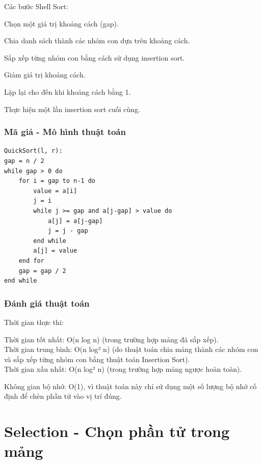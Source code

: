 \documentclass[12pt,a4paper]{report}
\begin{document}
Các bước Shell Sort:

Chọn một giá trị khoảng cách (gap).

Chia danh sách thành các nhóm con dựa trên khoảng cách.

Sắp xếp từng nhóm con bằng cách sử dụng insertion sort.

Giảm giá trị khoảng cách.

Lặp lại cho đến khi khoảng cách bằng 1.

Thực hiện một lần insertion sort cuối cùng.

\pagebreak

\subsection{ Mã giả - Mô hình thuật toán}

\begin{lstlisting}
QuickSort(l, r):
gap = n / 2
while gap > 0 do
    for i = gap to n-1 do
        value = a[i]
        j = i
        while j >= gap and a[j-gap] > value do
            a[j] = a[j-gap]
            j = j - gap
        end while
        a[j] = value
    end for
    gap = gap / 2
end while
\end{lstlisting}

\subsection{ Đánh giá thuật toán}

{Thời gian thực thi:

\hspace{0.5cm} Thời gian tốt nhất: O(n log n) (trong trường hợp mảng đã sắp xếp).\\

\hspace{0.5cm} Thời gian trung bình: O(n log² n) (do thuật toán chia mảng thành các nhóm con và sắp xếp từng nhóm con bằng thuật toán Insertion Sort).\\

\hspace{0.5cm} Thời gian xấu nhất: O(n log² n) (trong trường hợp mảng ngược hoàn toàn).\\}

{Không gian bộ nhớ: O(1), vì thuật toán này chỉ sử dụng một số lượng bộ nhớ cố định để chèn phần tử vào vị trí đúng.}

\chapter{ Selection - Chọn phần tử  trong mảng}
\end{document}
